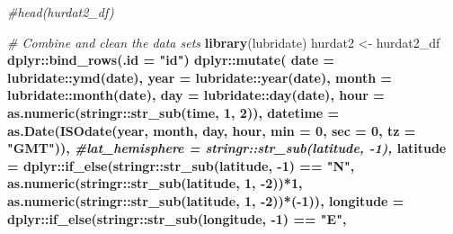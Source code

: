 \documentclass[]{book}
\newenvironment{Shaded}{\begin{snugshade}}{\end{snugshade}}
\newcommand{\CommentTok}[1]{\textcolor[rgb]{0.56,0.35,0.01}{\textit{#1}}}
\newcommand{\DataTypeTok}[1]{\textcolor[rgb]{0.13,0.29,0.53}{#1}}
\newcommand{\DecValTok}[1]{\textcolor[rgb]{0.00,0.00,0.81}{#1}}
\newcommand{\KeywordTok}[1]{\textcolor[rgb]{0.13,0.29,0.53}{\textbf{#1}}}
\newcommand{\NormalTok}[1]{#1}
\newcommand{\OperatorTok}[1]{\textcolor[rgb]{0.81,0.36,0.00}{\textbf{#1}}}
\newcommand{\StringTok}[1]{\textcolor[rgb]{0.31,0.60,0.02}{#1}}
\begin{document}
\begin{Shaded}
\begin{Highlighting}[]
\CommentTok{#head(hurdat2_df)}
\end{Highlighting}
\end{Shaded}

\begin{Shaded}
\begin{Highlighting}[]
\CommentTok{# Combine and clean the data sets}
\KeywordTok{library}\NormalTok{(lubridate)}
\NormalTok{hurdat2 <-}\StringTok{ }
\StringTok{  }\NormalTok{hurdat2_df }\OperatorTok{%>%}
\StringTok{  }\NormalTok{dplyr}\OperatorTok{::}\KeywordTok{bind_rows}\NormalTok{(}\DataTypeTok{.id =} \StringTok{"id"}\NormalTok{) }\OperatorTok{%>%}
\StringTok{  }\NormalTok{dplyr}\OperatorTok{::}\KeywordTok{mutate}\NormalTok{(}
    \DataTypeTok{date =}\NormalTok{ lubridate}\OperatorTok{::}\KeywordTok{ymd}\NormalTok{(date),}
    \DataTypeTok{year =}\NormalTok{ lubridate}\OperatorTok{::}\KeywordTok{year}\NormalTok{(date),}
    \DataTypeTok{month =}\NormalTok{ lubridate}\OperatorTok{::}\KeywordTok{month}\NormalTok{(date),}
    \DataTypeTok{day =}\NormalTok{ lubridate}\OperatorTok{::}\KeywordTok{day}\NormalTok{(date),}
    \DataTypeTok{hour =} \KeywordTok{as.numeric}\NormalTok{(stringr}\OperatorTok{::}\KeywordTok{str_sub}\NormalTok{(time, }\DecValTok{1}\NormalTok{, }\DecValTok{2}\NormalTok{)),}
    \DataTypeTok{datetime =} \KeywordTok{as.Date}\NormalTok{(}\KeywordTok{ISOdate}\NormalTok{(year, month, day, hour, }\DataTypeTok{min =} \DecValTok{0}\NormalTok{, }\DataTypeTok{sec =} \DecValTok{0}\NormalTok{, }\DataTypeTok{tz =} \StringTok{"GMT"}\NormalTok{)),}
    \CommentTok{#lat_hemisphere = stringr::str_sub(latitude, -1),}
    \DataTypeTok{latitude =}\NormalTok{ dplyr}\OperatorTok{::}\KeywordTok{if_else}\NormalTok{(stringr}\OperatorTok{::}\KeywordTok{str_sub}\NormalTok{(latitude, }\DecValTok{-1}\NormalTok{) }\OperatorTok{==}\StringTok{ "N"}\NormalTok{,}
                              \KeywordTok{as.numeric}\NormalTok{(stringr}\OperatorTok{::}\KeywordTok{str_sub}\NormalTok{(latitude, }\DecValTok{1}\NormalTok{, }\DecValTok{-2}\NormalTok{))}\OperatorTok{*}\DecValTok{1}\NormalTok{, }
                              \KeywordTok{as.numeric}\NormalTok{(stringr}\OperatorTok{::}\KeywordTok{str_sub}\NormalTok{(latitude, }\DecValTok{1}\NormalTok{, }\DecValTok{-2}\NormalTok{))}\OperatorTok{*}\NormalTok{(}\OperatorTok{-}\DecValTok{1}\NormalTok{)),}
    \DataTypeTok{longitude =}\NormalTok{ dplyr}\OperatorTok{::}\KeywordTok{if_else}\NormalTok{(stringr}\OperatorTok{::}\KeywordTok{str_sub}\NormalTok{(longitude, }\DecValTok{-1}\NormalTok{) }\OperatorTok{==}\StringTok{ "E"}\NormalTok{,}
}}
\end{Highlighting}
\end{Shaded}
\end{document}
